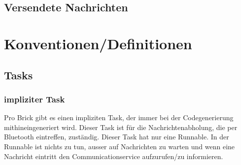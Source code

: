 \documentclass[a4paper,11pt]{scrreprt}
\begin{document}
\section{Versendete Nachrichten}

\chapter{Konventionen/Definitionen}
\section{Tasks}
\subsection{impliziter Task}
Pro Brick gibt es einen impliziten Task, der immer bei der Codegenerierung mithineingeneriert wird. Dieser Task ist für die Nachrichtenabholung, die per Bluetooth eintreffen, zuständig. Dieser Task hat nur eine Runnable. In der Runnable ist nichts zu tun, ausser auf Nachrichten zu warten und wenn eine Nachricht eintritt den Communicationservice aufzurufen/zu informieren.
\end{document}
